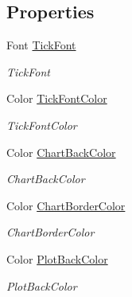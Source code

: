 \subsection*{Properties}
\begin{DoxyCompactItemize}
\item 
Font \mbox{\hyperlink{class_c_s_i_1_1_library_1_1_plotting_lib_1_1_chart_style_aa5bb7b451f58707e039e57f4eafcb04b}{Tick\+Font}}
\begin{DoxyCompactList}\small\item\em Tick\+Font \end{DoxyCompactList}\item 
Color \mbox{\hyperlink{class_c_s_i_1_1_library_1_1_plotting_lib_1_1_chart_style_aae974aaf3582ac62ae523c4bbf1d788c}{Tick\+Font\+Color}}
\begin{DoxyCompactList}\small\item\em Tick\+Font\+Color \end{DoxyCompactList}\item 
Color \mbox{\hyperlink{class_c_s_i_1_1_library_1_1_plotting_lib_1_1_chart_style_af99a359d7679b93df9fed74d73c8abb7}{Chart\+Back\+Color}}
\begin{DoxyCompactList}\small\item\em Chart\+Back\+Color \end{DoxyCompactList}\item 
Color \mbox{\hyperlink{class_c_s_i_1_1_library_1_1_plotting_lib_1_1_chart_style_a7ae27442fbfff5169d4f0f93b35d6519}{Chart\+Border\+Color}}
\begin{DoxyCompactList}\small\item\em Chart\+Border\+Color \end{DoxyCompactList}\item 
Color \mbox{\hyperlink{class_c_s_i_1_1_library_1_1_plotting_lib_1_1_chart_style_ae9b19696aded5bdf2d81040d332d97dd}{Plot\+Back\+Color}}
\begin{DoxyCompactList}\small\item\em Plot\+Back\+Color \end{DoxyCompactList}\item 

\end{DoxyCompactItemize}
